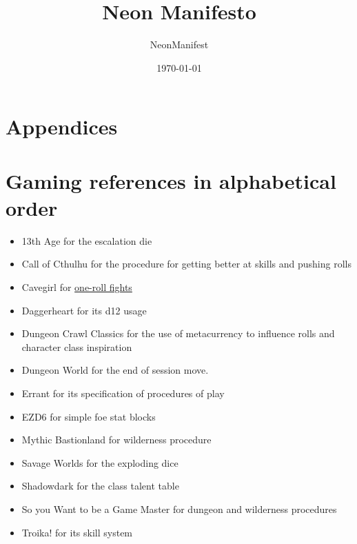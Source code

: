 \documentclass{article}
\title{Neon Manifesto}
\author{NeonManifest}
\date{\today}
\begin{document}
\maketitle

\tableofcontents









\appendix
\section*{Appendices}
\section{Gaming references in alphabetical order}
\begin{itemize}
    \item 13th Age for the escalation die
    \item Call of Cthulhu for the procedure for getting better at skills and pushing rolls
    \item Cavegirl for \href{https://cavegirlgames.blogspot.com/2018/03/one-roll-fights.html}{one-roll fights}
    \item Daggerheart for its d12 usage
    \item Dungeon Crawl Classics for the use of metacurrency to influence rolls and character 
          class inspiration
    \item Dungeon World for the end of session move.
    \item Errant for its specification of procedures of play
    \item EZD6 for simple foe stat blocks
    \item Mythic Bastionland for wilderness procedure
    \item Savage Worlds for the exploding dice
    \item Shadowdark for the class talent table
    \item So you Want to be a Game Master for dungeon and wilderness procedures
    \item Troika! for its skill system
\end{itemize}
\end{document}
